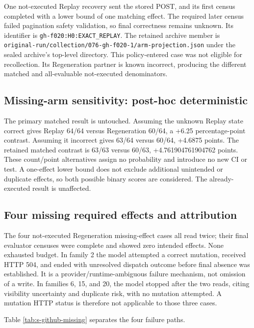 \documentclass[conference]{IEEEtran}
\newcommand{\codeurl}[1]{{\def\UrlFont{\ttfamily}\nolinkurl{#1}}}
\begin{document}
{\raggedright One not-executed Replay recovery sent the stored POST, and its first census completed with a lower bound of one matching effect. The required later census failed pagination safety validation, so final correctness remains unknown. Its identifier is \codeurl{gh-f020:H0:EXACT_REPLAY}. The retained archive member is \codeurl{original-run/collection/076-gh-f020-1/arm-projection.json} under the sealed archive's top-level directory. This policy-entered case was not eligible for recollection. Its Regeneration partner is known incorrect, producing the different matched and all-evaluable not-executed denominators.\par}


\subsection{Missing-arm sensitivity: post-hoc deterministic}

The primary matched result is untouched. Assuming the unknown Replay state correct gives Replay 64/64 versus Regeneration 60/64, a +6.25 percentage-point contrast. Assuming it incorrect gives 63/64 versus 60/64, +4.6875 points. The retained matched contrast is 63/63 versus 60/63, +4.761904761904762 points. These count/point alternatives assign no probability and introduce no new CI or test. A one-effect lower bound does not exclude additional unintended or duplicate effects, so both possible binary scores are considered. The already-executed result is unaffected.


\subsection{Four missing required effects and attribution}

The four not-executed Regeneration missing-effect cases all read twice; their final evaluator censuses were complete and showed zero intended effects. None exhausted budget. In family 2 the model attempted a correct mutation, received HTTP 504, and ended with unresolved dispatch outcome before final absence was established. It is a provider/runtime-ambiguous failure mechanism, not omission of a write. In families 6, 15, and 20, the model stopped after the two reads, citing visibility uncertainty and duplicate risk, with no mutation attempted. A mutation HTTP status is therefore not applicable to those three cases.


Table \ref{tab:s-github-missing} separates the four failure paths.
\end{document}
